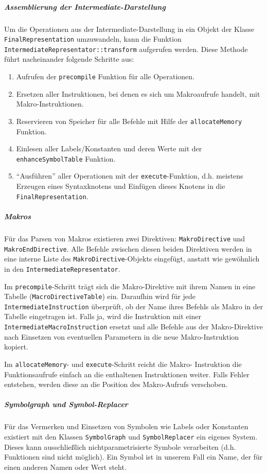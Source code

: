 \subparagraph{Assemblierung der Intermediate-Darstellung}
\label{sec:dev_parser_assem_inter} Um die Operationen aus der
Intermediate-Darstellung in ein Objekt der Klasse \texttt{FinalRepresentation}
umzuwandeln, kann die Funktion
\texttt{IntermediateRepresentator::\allowbreak{}transform} aufgerufen werden.
Diese Methode führt nacheinander folgende Schritte aus:

\begin{enumerate}
	\item Aufrufen der \texttt{precompile} Funktion für alle Operationen. \item
	Ersetzen aller Instruktionen, bei denen es sich um Makroaufrufe handelt, mit
	Makro-Instruktionen. \item Reservieren von Speicher für alle Befehle mit
	Hilfe der \texttt{allocateMemory} Funktion. \item Einlesen aller
	Labels/Konstanten und deren Werte mit der \texttt{enhanceSymbolTable}
	Funktion. \item "`Ausführen"' aller Operationen mit der
	\texttt{execute}-Funktion, d.h. meistens Erzeugen eines Syntaxknotens und
	Einfügen dieses Knotens in die \texttt{FinalRepresentation}.
\end{enumerate}

\subparagraph{Makros} Für das Parsen von Makros existieren zwei Direktiven:
\texttt{Makro\-Directive} und \texttt{Makro\-End\-Directive}. Alle Befehle
zwischen diesen beiden Direktiven werden in eine interne Liste des
\texttt{Makro\-Directive}-Objekts eingefügt, anstatt wie gewöhnlich in den
\texttt{Intermediate\-Representator}.

Im \texttt{precompile}-Schritt trägt sich die Makro-Direktive mit ihrem Namen in
eine Tabelle (\texttt{Macro\-Directive\-Table}) ein. Daraufhin wird für jede
\texttt{Intermediate\-Instruction} überprüft, ob der Name ihres Befehls als
Makro in der Tabelle eingetragen ist. Falls ja, wird die Instruktion mit einer
\texttt{Intermediate\-Macro\-Instruction} ersetzt und alle Befehle aus der
Makro-Direktive nach Einsetzen von eventuellen Parametern in die neue
Makro-Instruktion kopiert.

Im \texttt{allocateMemory}- und \texttt{execute}-Schritt reicht die Makro-
Instruktion die Funktionsaufrufe einfach an die enthaltenen Instruktionen
weiter. Falls Fehler entstehen, werden diese an die Position des Makro-Aufrufs
verschoben.

\subparagraph{Symbolgraph und Symbol-Replacer} Für das Vermerken und Einsetzen
von Symbolen wie Labels oder Konstanten existiert mit den Klassen
\texttt{SymbolGraph} und \texttt{SymbolReplacer} ein eigenes System. Dieses kann
ausschließlich nichtparametrisierte Symbole verarbeiten (d.h. Funktionen sind
nicht möglich). Ein Symbol ist in unserem Fall ein Name, der für einen anderen
Namen oder Wert steht.

